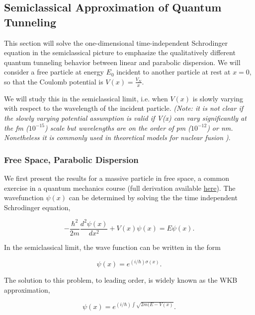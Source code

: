\documentclass[onecolumn,
               superscriptaddress,
               floatfix,
               longbibliography, 
               showkeys,apl]{revtex4-2}
\begin{document}
\begin{appendices}
\section{Semiclassical Approximation of Quantum Tunneling}

This section will solve the one-dimensional time-independent Schrodinger equation in the semiclassical picture to emphasize the qualitatively different quantum tunneling behavior between linear and parabolic dispersion. We will consider a free particle at energy $E_0$ incident to another particle at rest at $x=0$, so that the Coulomb potential is $V(x)=\frac{V_N}{x}$.

We will study this in the semiclassical limit, i.e. when $V(x)$ is slowly varying with respect to the wavelength of the incident particle. \textit{(Note: it is not clear if the slowly varying potential assumption is valid if V(x) can vary significantly at the fm ($10^{-15}$) scale but wavelengths are on the order of pm ($10^{-12}$) or nm. Nonetheless it is commonly used in theoretical models for nuclear fusion \cite{PhysRevC.110.034614,Liu_2021})}. 

\subsubsection{Free Space, Parabolic Dispersion}

We first present the results for a massive particle in free space, a common exercise in a quantum mechanics course \cite{FowlerQuantumMechanics} (full derivation available \href{https://phys.libretexts.org/Bookshelves/Quantum_Mechanics/Quantum_Mechanics_(Fowler)/08%3A_Approximate_Methods/8.02%3A_The_WKB_Approximation}{here}). The wavefunction $\psi(x)$ can be determined by solving the the time independent Schrodinger equation,

\begin{equation}
    -\frac{\hbar^2}{2m} \frac{d^2\psi(x)}{dx^2} + V(x)\psi(x) = E\psi(x).
\end{equation}

In the semiclassical limit, the wave function can be written in the form

\begin{equation}
    \psi(x) = e^{(i/\hbar)\sigma(x)}.
\end{equation}

The solution to this problem, to leading order, is widely known as the WKB approximation,

\begin{equation}
    \psi(x) = e^{(i/\hbar)\int\sqrt{2m(E-V(x)}}.
\end{equation}


\end{appendices}
\end{document}
